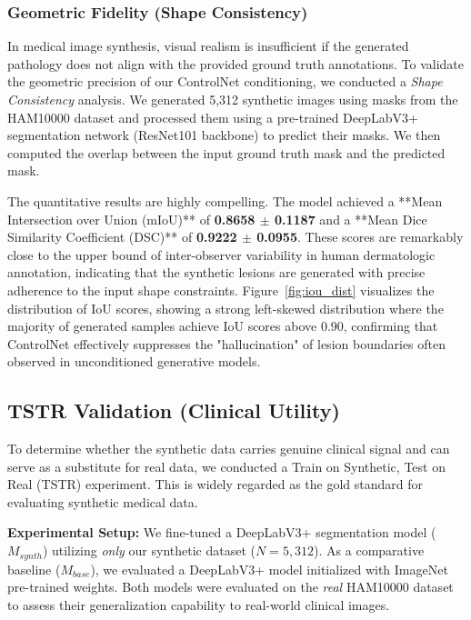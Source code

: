 \documentclass[a4paper,11pt]{article}
\begin{document}
\subsubsection{Geometric Fidelity (Shape Consistency)}
In medical image synthesis, visual realism is insufficient if the generated pathology does not align with the provided ground truth annotations. To validate the geometric precision of our ControlNet conditioning, we conducted a \textit{Shape Consistency} analysis. We generated 5,312 synthetic images using masks from the HAM10000 dataset and processed them using a pre-trained DeepLabV3+ segmentation network (ResNet101 backbone) to predict their masks. We then computed the overlap between the input ground truth mask and the predicted mask.

The quantitative results are highly compelling. The model achieved a **Mean Intersection over Union (mIoU)** of \textbf{0.8658 $\pm$ 0.1187} and a **Mean Dice Similarity Coefficient (DSC)** of \textbf{0.9222 $\pm$ 0.0955}. These scores are remarkably close to the upper bound of inter-observer variability in human dermatologic annotation, indicating that the synthetic lesions are generated with precise adherence to the input shape constraints. Figure~\ref{fig:iou_dist} visualizes the distribution of IoU scores, showing a strong left-skewed distribution where the majority of generated samples achieve IoU scores above 0.90, confirming that ControlNet effectively suppresses the "hallucination" of lesion boundaries often observed in unconditioned generative models.



\subsection{TSTR Validation (Clinical Utility)}
To determine whether the synthetic data carries genuine clinical signal and can serve as a substitute for real data, we conducted a Train on Synthetic, Test on Real (TSTR) experiment. This is widely regarded as the gold standard for evaluating synthetic medical data.

\textbf{Experimental Setup:} We fine-tuned a DeepLabV3+ segmentation model ($M_{synth}$) utilizing \textit{only} our synthetic dataset ($N=5,312$). As a comparative baseline ($M_{base}$), we evaluated a DeepLabV3+ model initialized with ImageNet pre-trained weights. Both models were evaluated on the \textit{real} HAM10000 dataset to assess their generalization capability to real-world clinical images.
\end{document}
